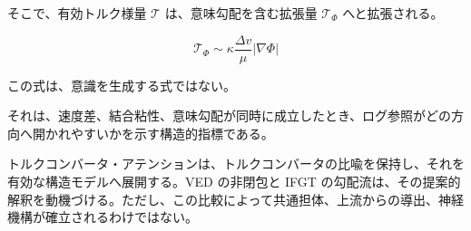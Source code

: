 そこで、有効トルク様量 $\mathcal{T}$ は、意味勾配を含む拡張量 $\mathcal{T}_{\Phi}$ へと拡張される。

\begin{equation}
\mathcal{T}_{\Phi}
\sim
\kappa
\frac{\Delta v}{\mu}
|\nabla \Phi|
\end{equation}

この式は、意識を生成する式ではない。

それは、速度差、結合粘性、意味勾配が同時に成立したとき、ログ参照がどの方向へ開かれやすいかを示す構造的指標である。

トルクコンバータ・アテンションは、トルクコンバータの比喩を保持し、それを有効な構造モデルへ展開する。VED の非閉包と IFGT の勾配流は、その提案的解釈を動機づける。ただし、この比較によって共通担体、上流からの導出、神経機構が確立されるわけではない。
